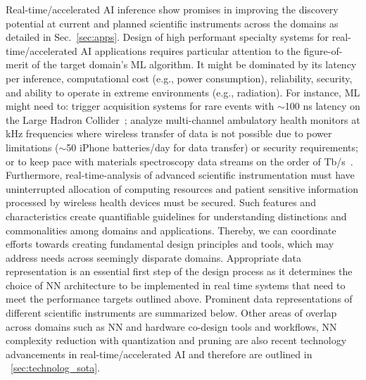 \noindent 
Real-time/accelerated AI inference show promises in improving the discovery potential at current and planned scientific instruments across the domains as detailed in Sec.~\ref{sec:apps}. Design of high performant specialty systems for real-time/accelerated AI applications requires particular attention to the figure-of-merit of the target domain's ML algorithm. It might be dominated by its latency per inference, computational cost (e.g., power consumption), reliability, security, and ability to operate in extreme environments (e.g., radiation). For instance, ML might need to: trigger acquisition systems for rare events with $\sim$100 ns latency on the Large Hadron Collider~\cite{Duarte:2018ite}; analyze multi-channel ambulatory health monitors at kHz frequencies where wireless transfer of data is not possible due to power limitations ($\sim$50 iPhone batteries/day for data transfer) or security requirements; or to keep pace with materials spectroscopy data streams on the order of Tb/s~\cite{Hart2017-bf}. Furthermore, real-time-analysis of advanced scientific instrumentation must have uninterrupted allocation of computing resources and patient sensitive information processed by wireless health devices must be secured. Such features and characteristics create quantifiable guidelines for understanding distinctions and commonalities among domains and applications. Thereby, we can coordinate efforts towards creating fundamental design principles and tools, which may address needs across seemingly disparate domains. Appropriate data representation is an essential first step of the design process as it determines the choice of NN architecture to be implemented in real time systems that need to meet the performance targets outlined above. Prominent data representations of different scientific instruments are summarized below. Other areas of overlap across domains such as NN and hardware co-design tools and workflows, NN complexity reduction with quantization and pruning are also recent technology advancements in real-time/accelerated AI and therefore are outlined in ~\ref{sec:technolog_sota}.

